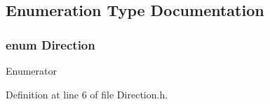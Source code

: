 \subsection{Enumeration Type Documentation}
\subsubsection[{Direction}]{\setlength{\rightskip}{0pt plus 5cm}enum {\bf Direction}\hspace{0.3cm}{\ttfamily [strong]}}\label{_direction_8h_a224b9163917ac32fc95a60d8c1eec3aa}
\begin{Desc}
\item[Enumerator]\par
\begin{description}
\item[{\em 
Up\label{_direction_8h_a224b9163917ac32fc95a60d8c1eec3aaa258f49887ef8d14ac268c92b02503aaa}
}]\item[{\em 
Down\label{_direction_8h_a224b9163917ac32fc95a60d8c1eec3aaa08a38277b0309070706f6652eeae9a53}
}]\end{description}
\end{Desc}


Definition at line 6 of file Direction.\+h.

